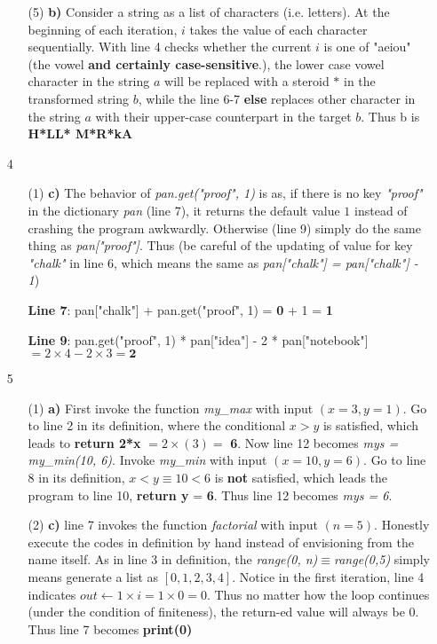 \documentclass[11pt]{amsart}
\begin{document}
\begin{itemize}
\begin{itemize}
\item[(5)] \textbf{b)} Consider a string as a list of characters (i.e. letters). At the beginning of each iteration, $i$ takes the value of each character sequentially. With line 4 checks whether the current $i$ is one of "aeiou" (the vowel \textbf{and certainly case-sensitive}.), the lower case vowel character in the string $a$ will be replaced with a steroid $*$ in the transformed string $b$, while the line 6-7 \textbf{else} replaces other character in the string $a$ with their upper-case counterpart in the target $b$. Thus b is \textbf{H*LL* M*R*kA} 
\end{itemize}

\item [4]
\begin{itemize}
\item [(1)] \textbf{c)} The behavior of \textit{pan.get("proof", 1)} is as, if there is no key \textit{"proof"} in the dictionary \textit{pan} (line 7), it returns the default value $1$ instead of crashing the program awkwardly. Otherwise (line 9) simply do the same thing as \textit{pan["proof"]}. Thus (be careful of the updating of value for key \textit{"chalk"} in line 6, which means the same as \textit{pan["chalk"] = pan["chalk"] - 1})

\textbf{Line 7}: pan["chalk"] + pan.get("proof", 1) = \textbf{0}  + 1 = \textbf{1}

\textbf{Line 9}: pan.get("proof", 1) * pan["idea"] - 2 * pan["notebook"] $= 2 \times 4 - 2 \times 3 = \mathbf{2}$
\end{itemize}


\item [5]
\begin{itemize}
\item [(1)] \textbf{a)} First invoke the function \textit{my\_max} with input $(x = 3,y = 1)$. Go to line 2 in its definition, where the conditional $x > y$ is satisfied, which leads to \textbf{return 2*x} $= 2 \times (3) =$ \textbf{6}. Now line 12 becomes \textit{mys = my\_min(10, 6)}. Invoke \textit{my\_min} with input $(x = 10, y = 6)$. Go to line 8 in its definition, $x<y \equiv 10 < 6$ is \textbf{not} satisfied, which leads the program to line 10, \textbf{return y} = \textbf{6}. Thus line 12 becomes \textit{mys = 6}.
\item [(2)] \textbf{c)} line 7 invokes the function \textit{factorial} with input $(n = 5)$. Honestly execute the codes in definition by hand instead of envisioning from the name itself. As in line 3 in definition, the \textit{range(0, n)}$\equiv$\textit{range(0,5)} simply means generate a list as $[0,1,2,3,4]$. Notice in the first iteration, line 4 indicates $out \gets 1 \times i = 1 \times 0 = 0$. Thus no matter how the loop continues (under the condition of finiteness), the return-ed value will always be 0. Thus line 7 becomes \textbf{print(0)}
\end{itemize}


\end{itemize}
\end{document}
